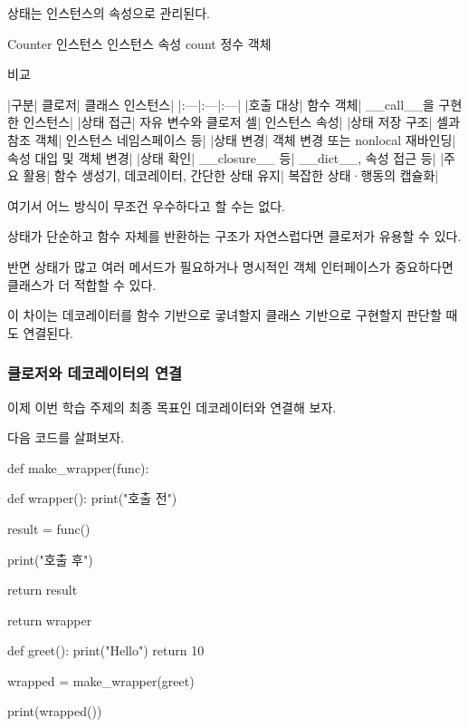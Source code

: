 상태는 인스턴스의 속성으로 관리된다.

\begin{dhksmry}[centered]
Counter 인스턴스
\da
인스턴스 속성 count
\da
정수 객체
\end{dhksmry}

\begin{dhknote}
\begin{dhksmry}[centered]
비교
\end{dhksmry}
\end{dhknote}

\begin{dhktable}
|구분|	클로저|	클래스 인스턴스|
|:---|:---|:---|
|호출 대상|	함수 객체|	__call__을 구현한 인스턴스|
|상태 접근|	자유 변수와 클로저 셀|	인스턴스 속성|
|상태 저장 구조|	셀과 참조 객체|	인스턴스 네임스페이스 등|
|상태 변경|	객체 변경 또는 nonlocal 재바인딩|	속성 대입 및 객체 변경|
|상태 확인|	__closure__ 등|	__dict__, 속성 접근 등|
|주요 활용|	함수 생성기, 데코레이터, 간단한 상태 유지|	복잡한 상태·행동의 캡슐화|
\end{dhktable}

여기서 어느 방식이 무조건 우수하다고 할 수는 없다.

상태가 단순하고 함수 자체를 반환하는 구조가 자연스럽다면 클로저가 유용할 수 있다.

반면 상태가 많고 여러 메서드가 필요하거나 명시적인 객체 인터페이스가 중요하다면 클래스가 더 적합할 수 있다.

이 차이는 데코레이터를 함수 기반으로 궇녀할지 클래스 기반으로 구현할지 판단할 때도 연결된다.

\subsubsection{클로저와 데코레이터의 연결}

이제 이번 학습 주제의 최종 목표인 데코레이터와 연결해 보자.

다음 코드를 살펴보자.

\begin{dhkcode}
def make_wrapper(func):

    def wrapper():
        print("호출 전")

        result = func()

        print("호출 후")

        return result

    return wrapper


def greet():
    print("Hello")
    return 10


wrapped = make_wrapper(greet)

print(wrapped())
\end{dhkcode}

